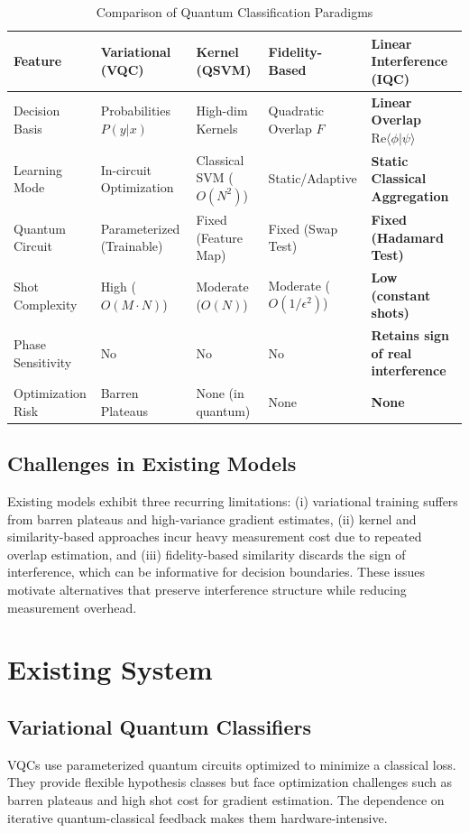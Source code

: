 \documentclass[conference]{IEEEtran}
\begin{document}
\begin{table}[t]
\centering
\caption{Comparison of Quantum Classification Paradigms}
\label{tab:comparison}
\begin{tabular}{@{}lllll@{}}
\toprule
Feature & Variational (VQC) & Kernel (QSVM) & Fidelity-Based & \textbf{Linear Interference (IQC)} \\ \midrule
Decision Basis & Probabilities $P(y|x)$ & High-dim Kernels & Quadratic Overlap $F$ & \textbf{Linear Overlap $\mathrm{Re}\langle \phi|\psi \rangle$} \\
Learning Mode & In-circuit Optimization & Classical SVM ($O(N^2)$) & Static/Adaptive & \textbf{Static Classical Aggregation} \\
Quantum Circuit & Parameterized (Trainable) & Fixed (Feature Map) & Fixed (Swap Test) & \textbf{Fixed (Hadamard Test)} \\
Shot Complexity & High ($O(M \cdot N)$) & Moderate ($O(N)$) & Moderate ($O(1/\epsilon^2)$) & \textbf{Low (constant shots)} \\
Phase Sensitivity & No & No & No & \textbf{Retains sign of real interference} \\
Optimization Risk & Barren Plateaus & None (in quantum) & None & \textbf{None} \\ \bottomrule
\end{tabular}
\end{table}

\subsection{Challenges in Existing Models}
Existing models exhibit three recurring limitations: (i) variational training suffers from barren plateaus and high-variance gradient estimates, (ii) kernel and similarity-based approaches incur heavy measurement cost due to repeated overlap estimation, and (iii) fidelity-based similarity discards the sign of interference, which can be informative for decision boundaries. These issues motivate alternatives that preserve interference structure while reducing measurement overhead.

\section{Existing System}

\subsection{Variational Quantum Classifiers}
VQCs use parameterized quantum circuits optimized to minimize a classical loss. They provide flexible hypothesis classes but face optimization challenges such as barren plateaus and high shot cost for gradient estimation. The dependence on iterative quantum-classical feedback makes them hardware-intensive.
\end{document}
